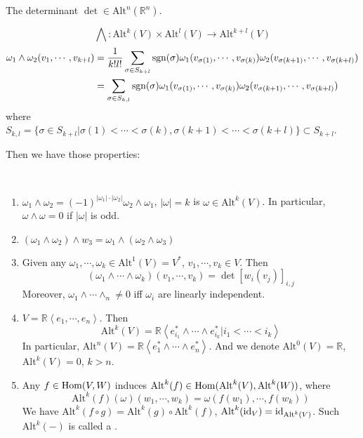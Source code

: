 The determinant  $ \det\in \mathrm{Alt}^n(\mathbb{R}^n) $.
\begin{definition}
    \[\bigwedge:\mathrm{Alt}^k(V)\times\mathrm{Alt}^l(V)\rightarrow \mathrm{Alt}^{k+l}(V)\]
    \begin{align*}
        \omega_1\wedge \omega_2(v_1,\cdots,v_{k+l})&=\displaystyle\frac{1}{k!l!}\sum_{\sigma\in S_{k+l}}\mathrm{sgn}(\sigma)\omega_1(v_{\sigma(1)},\cdots,v_{\sigma(k)})\omega_2(v_{\sigma(k+1)},\cdots,v_{\sigma(k+l)})\\
        &=\sum_{\sigma\in S_{k,l}}\mathrm{sgn}(\sigma)\omega_1(v_{\sigma(1)},\cdots,v_{\sigma(k)})\omega_2(v_{\sigma(k+1)},\cdots,v_{\sigma(k+l)})
    \end{align*}
    where  $ S_{k,l}=\{\sigma\in S_{k+l}|\sigma(1)<\cdots<\sigma(k),\sigma(k+1)<\cdots<\sigma(k+l)\} \subset S_{k+l}$. 
\end{definition}
Then we have those properties:
\begin{proposition}
    \,
    \begin{enumerate}[label=(\arabic*)]
        \item  $ \omega_1\wedge \omega_2=(-1)^{|\omega_1|\cdot|\omega_2|}\omega_2\wedge \omega_1  $,  $ |\omega|=k $ is  $ \omega\in\mathrm{Alt}^k(V) $. In particular,  $ \omega\wedge \omega=0 $ if  $ |\omega| $ is odd.    
        \item  $ (\omega_1\wedge \omega_2)\wedge w_3=\omega_1\wedge(\omega_2\wedge \omega_3) $ 
        \item Given any  $ \omega_1,\cdots,\omega_k\in \mathrm{Alt}^1(V)=V^* $,  $ v_1,\cdots,v_k\in V $. Then 
        \begin{equation}
            (\omega_1\wedge \cdots \wedge \omega_k)(v_1,\cdots,v_k)=\det\left[w_i(v_j)\right]_{i,j}
        \end{equation}  
        Moreover,  $ \omega_1\wedge \cdots\wedge_n\not=0 $ iff  $ \omega_i $ are linearly independent.
        \item  $ V=\mathbb{R}\left<e_1,\cdots,e_n\right> $. Then 
        \begin{equation}
            \mathrm{Alt}^k(V)=\mathbb{R}\left<e_{i_1}^*\wedge\cdots \wedge e_{i_k}^*|i_1<\cdots<i_k\right>
        \end{equation}  
        In particular,  $ \mathrm{Alt}^n(V)=\mathbb{R}\left<e_1^*\wedge\cdots\wedge e_n^*\right> $.
        And we denote
             $ \mathrm{Alt}^0(V)=\mathbb{R} $,  $ \mathrm{Alt}^k(V)=0 $,  $ k>n $. 
        \item Any  $ f\in \mathrm{Hom} (V,W) $ induces  $ \mathrm{Alt}^k(f)\in \mathrm{Hom}(\mathrm{Alt}^k(V),\mathrm{Alt}^k(W)) $, where 
        \begin{equation}
            \mathrm{Alt}^k(f)(\omega)(w_1,\cdots , w_k)=\omega(f(w_1),\cdots,f(w_k))
        \end{equation}
        We have   $ \mathrm{Alt}^k(f\circ g)=\mathrm{Alt}^k(g)\circ \mathrm{Alt}^k(f) $,  $ \mathrm{Alt}^k(\mathrm{id}_V)=\mathrm{id}_{\mathrm{Alt}^k(V)} $.
        Such  $ \mathrm{Alt}^k(-) $ is called  a .  
    \end{enumerate}
\end{proposition}